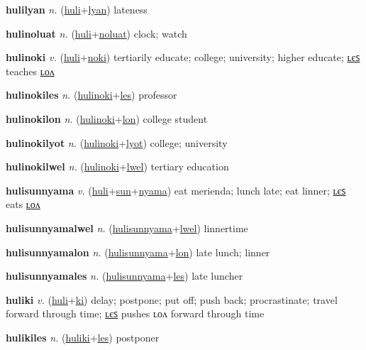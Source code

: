 \textbf{\hypertarget{hulilyan}{hulilyan}} \textit{n.} (\hyperlink{huli}{huli}+\allowbreak \hyperlink{lyan}{lyan})
lateness

\textbf{\hypertarget{hulinoluat}{hulinoluat}} \textit{n.} (\hyperlink{huli}{huli}+\allowbreak \hyperlink{noluat}{noluat})
clock; watch

\textbf{\hypertarget{hulinoki}{hulinoki}} \textit{v.} (\hyperlink{huli}{huli}+\allowbreak \hyperlink{noki}{noki})
tertiarily educate; college; university; higher educate; \hyperlink{hulinokiles}{ʟєꜱ} teaches \hyperlink{hulinokilon}{ʟᴏᴧ}

\textbf{\hypertarget{hulinokiles}{hulinokiles}} \textit{n.} (\hyperlink{hulinoki}{hulinoki}+\allowbreak \hyperlink{les}{les})
professor

\textbf{\hypertarget{hulinokilon}{hulinokilon}} \textit{n.} (\hyperlink{hulinoki}{hulinoki}+\allowbreak \hyperlink{lon}{lon})
college student

\textbf{\hypertarget{hulinokilyot}{hulinokilyot}} \textit{n.} (\hyperlink{hulinoki}{hulinoki}+\allowbreak \hyperlink{lyot}{lyot})
college; university

\textbf{\hypertarget{hulinokilwel}{hulinokilwel}} \textit{n.} (\hyperlink{hulinoki}{hulinoki}+\allowbreak \hyperlink{lwel}{lwel})
tertiary education

\textbf{\hypertarget{hulisunnyama}{hulisunnyama}} \textit{v.} (\hyperlink{huli}{huli}+\allowbreak \hyperlink{sun}{sun}+\allowbreak \hyperlink{nyama}{nyama})
eat merienda; lunch late; eat linner; \hyperlink{hulisunnyamales}{ʟєꜱ} eats \hyperlink{hulisunnyamalon}{ʟᴏᴧ}

\textbf{\hypertarget{hulisunnyamalwel}{hulisunnyamalwel}} \textit{n.} (\hyperlink{hulisunnyama}{hulisunnyama}+\allowbreak \hyperlink{lwel}{lwel})
linnertime

\textbf{\hypertarget{hulisunnyamalon}{hulisunnyamalon}} \textit{n.} (\hyperlink{hulisunnyama}{hulisunnyama}+\allowbreak \hyperlink{lon}{lon})
late lunch; linner

\textbf{\hypertarget{hulisunnyamales}{hulisunnyamales}} \textit{n.} (\hyperlink{hulisunnyama}{hulisunnyama}+\allowbreak \hyperlink{les}{les})
late luncher

\textbf{\hypertarget{huliki}{huliki}} \textit{v.} (\hyperlink{huli}{huli}+\allowbreak \hyperlink{ki}{ki})
delay; postpone; put off; push back; procrastinate; travel forward through time; \hyperlink{hulikiles}{ʟєꜱ} pushes ʟᴏᴧ forward through time

\textbf{\hypertarget{hulikiles}{hulikiles}} \textit{n.} (\hyperlink{huliki}{huliki}+\allowbreak \hyperlink{les}{les})
postponer

